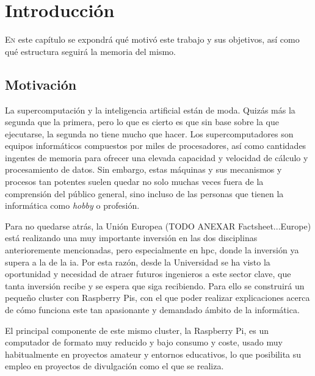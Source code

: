 \chapter{Introducción}
\label{chap:introducion}

\lettrine{E}{n} este capítulo se expondrá qué motivó este trabajo y sus objetivos, así como qué estructura seguirá la memoria del mismo.


\section{Motivación}
\label{sec:motivacion}

La supercomputación y la inteligencia artificial están de moda. Quizás más la segunda que la primera, pero lo que es cierto es que sin base sobre la que ejecutarse, la segunda no tiene mucho que hacer.
Los supercomputadores son equipos informáticos compuestos por miles de procesadores, así como cantidades ingentes de memoria para ofrecer una elevada capacidad y velocidad de cálculo y procesamiento de datos.
Sin embargo, estas máquinas y sus mecanismos y procesos tan potentes suelen quedar no solo muchas veces fuera de la comprensión del público general, sino incluso de las personas que tienen la informática como \textit{hobby} o profesión.

Para no quedarse atrás, la Unión Europea (TODO ANEXAR Factsheet...Europe) está realizando una muy importante inversión en las dos disciplinas anterioremente mencionadas, pero especialmente en \acrshort{hpc}, donde la inversión ya supera a la de la \acrshort{ia}.
Por esta razón, desde la Universidad se ha visto la oportunidad y necesidad de atraer futuros ingenieros a este sector clave, que tanta inversión recibe y se espera que siga recibiendo. Para ello se construirá un pequeño cluster con Raspberry Pis, con el que poder realizar explicaciones acerca de cómo funciona este tan apasionante y demandado ámbito de la informática.

El principal componente de este mismo cluster, la Raspberry Pi, es un computador de formato muy reducido y bajo consumo y coste, usado muy habitualmente en proyectos amateur y entornos educativos, lo que posibilita su empleo en proyectos de divulgación como el que se realiza.

